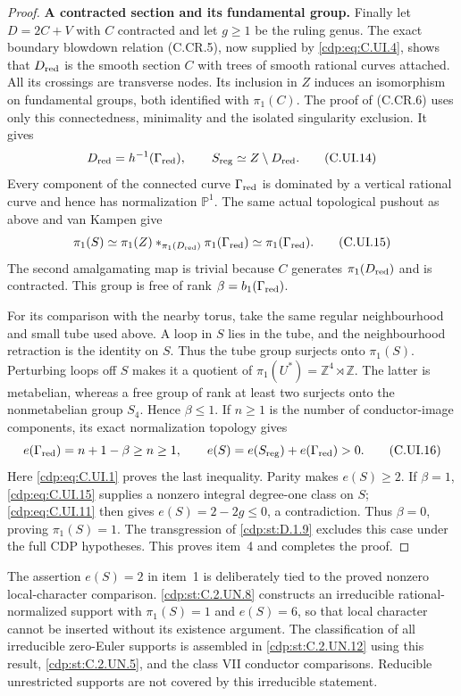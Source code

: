 \begin{proof}
\par\medskip\noindent\textbf{A contracted section and its fundamental group.}\quad
Finally let $D=2C+V$ with $C$ contracted and
let $g\ge1$ be the ruling genus. The exact
boundary blowdown relation (C.CR.5), now
supplied by \eqref{cdp:eq:C.UI.4}, shows that $D_{\rm red}$
is the smooth section $C$ with trees of smooth
rational curves attached. All its crossings
are transverse nodes. Its inclusion in $Z$
induces an isomorphism on fundamental groups,
both identified with $\pi_1(C)$.
The proof of (C.CR.6) uses only this
connectedness, minimality and the isolated
singularity exclusion. It gives
\[
 D_{\rm red}=h^{-1}(\Gamma_{\rm red}),\qquad
 S_{\rm reg}\simeq Z\setminus D_{\rm red}.
 \tag{C.UI.14}\label{cdp:eq:C.UI.14}
\]
Every component of the connected curve
$\Gamma_{\rm red}$ is dominated by a vertical
rational curve and hence has normalization
$\mathbb P^1$. The same actual topological
pushout as above and van Kampen give
\[
 \pi_1(S)\simeq
 \pi_1(Z)*_{\pi_1(D_{\rm red})}\pi_1(\Gamma_{\rm red})
 \simeq\pi_1(\Gamma_{\rm red}).
 \tag{C.UI.15}\label{cdp:eq:C.UI.15}
\]
The second amalgamating map is trivial because
$C$ generates $\pi_1(D_{\rm red})$ and is
contracted. This group is free of rank
$\beta=b_1(\Gamma_{\rm red})$.

For its comparison with the nearby torus,
take the same regular neighbourhood and
small tube used above. A loop in $S$ lies
in the tube, and the neighbourhood retraction
is the identity on $S$. Thus the tube group
surjects onto $\pi_1(S)$. Perturbing loops
off $S$ makes it a quotient of
$\pi_1(U^*)=\mathbb Z^4\rtimes\mathbb Z$.
The latter is metabelian, whereas a free
group of rank at least two surjects onto
the nonmetabelian group $S_4$. Hence
$\beta\le1$. If $n\ge1$ is the number
of conductor-image components, its exact
normalization topology gives
\[
 e(\Gamma_{\rm red})=n+1-\beta\ge n\ge1,
 \qquad e(S)=e(S_{\rm reg})+e(\Gamma_{\rm red})>0.
 \tag{C.UI.16}\label{cdp:eq:C.UI.16}
\]
Here \eqref{cdp:eq:C.UI.1} proves the last inequality.
Parity makes $e(S)\ge2$. If $\beta=1$,
\eqref{cdp:eq:C.UI.15} supplies a nonzero integral
degree-one class on $S$; \eqref{cdp:eq:C.UI.11} then
gives $e(S)=2-2g\le0$, a contradiction.
Thus $\beta=0$, proving $\pi_1(S)=1$.
The transgression of \ref{cdp:st:D.1.9} excludes this
case under the full CDP hypotheses. This
proves item~4 and completes the proof.
\end{proof}

The assertion $e(S)=2$ in item~1 is deliberately tied
to the proved nonzero local-character comparison.
\ref{cdp:st:C.2.UN.8} constructs an irreducible rational-normalized
support with $\pi_1(S)=1$ and $e(S)=6$, so that
local character cannot be inserted without its
existence argument. The classification of all
irreducible zero-Euler supports is assembled in
\ref{cdp:st:C.2.UN.12} using this result, \ref{cdp:st:C.2.UN.5}, and the
class VII conductor comparisons. Reducible
unrestricted supports are not covered by this
irreducible statement.


